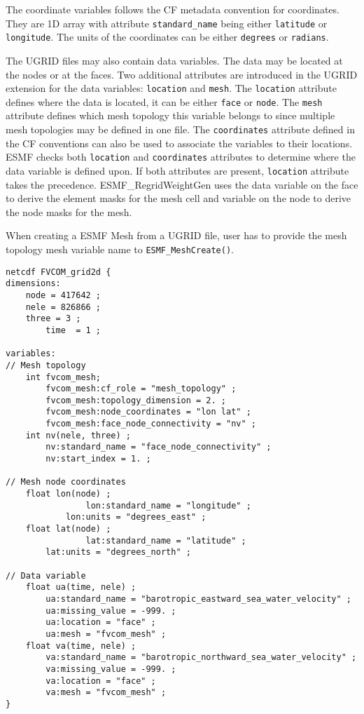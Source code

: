 The coordinate variables follows the CF metadata convention for coordinates.  They are 1D array with attribute
{\tt standard\_name} being either {\tt latitude} or {\tt longitude}.  The units of the coordinates can be either {\tt degrees} or {\tt radians}.

The UGRID files may also contain data variables.  The data may be located at the nodes or at the faces.  Two additional attributes are introduced in the UGRID extension for the data variables:  {\tt location} and {\tt mesh}.  The {\tt location}
attribute defines where the data is located, it can be either {\tt face} or {\tt node}.  The {\tt mesh} attribute defines which mesh topology this variable belongs to since multiple mesh topologies may be defined in one
file.  The {\tt coordinates} attribute defined in the CF conventions can also be used to associate the variables to their locations.  ESMF checks both {\tt location} and {\tt coordinates} attributes to determine where the data variable is defined upon. If both attributes are present, {\tt location} attribute takes the precedence.  ESMF\_RegridWeightGen uses the data variable on the face to derive the element masks for the mesh cell and variable on the node to derive the node masks for the mesh. 

When creating a ESMF Mesh from a UGRID file, user has to provide the mesh topology mesh variable name to {\tt ESMF\_MeshCreate()}.

\begin{verbatim}
netcdf FVCOM_grid2d {
dimensions:
	node = 417642 ;
	nele = 826866 ;
	three = 3 ;
        time  = 1 ;

variables:
// Mesh topology
	int fvcom_mesh;
		fvcom_mesh:cf_role = "mesh_topology" ;
		fvcom_mesh:topology_dimension = 2. ;
		fvcom_mesh:node_coordinates = "lon lat" ;
		fvcom_mesh:face_node_connectivity = "nv" ;
	int nv(nele, three) ;
		nv:standard_name = "face_node_connectivity" ;
		nv:start_index = 1. ;

// Mesh node coordinates
	float lon(node) ;
                lon:standard_name = "longitude" ;
	        lon:units = "degrees_east" ;
	float lat(node) ;
                lat:standard_name = "latitude" ;
		lat:units = "degrees_north" ;

// Data variable
	float ua(time, nele) ;
		ua:standard_name = "barotropic_eastward_sea_water_velocity" ;
		ua:missing_value = -999. ;
		ua:location = "face" ;
		ua:mesh = "fvcom_mesh" ;
	float va(time, nele) ;
		va:standard_name = "barotropic_northward_sea_water_velocity" ;
		va:missing_value = -999. ;
		va:location = "face" ;
		va:mesh = "fvcom_mesh" ;
}
\end{verbatim}


